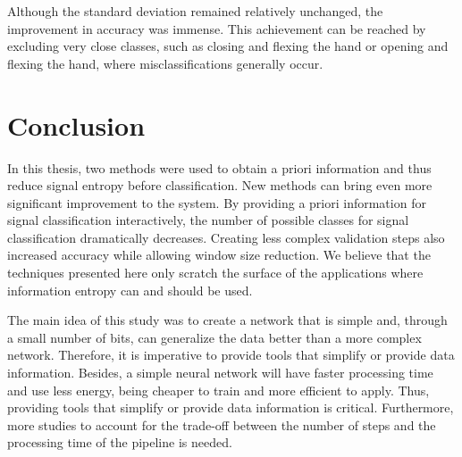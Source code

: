 \documentclass[letterpaper, 10 pt, conference]{ieeeconf}  %
\begin{document}
Although the standard deviation remained relatively unchanged, the improvement in accuracy was immense. This achievement can be reached by excluding very close classes, such as closing and flexing the hand or opening and flexing the hand, where misclassifications generally occur.

\section{Conclusion}

In this thesis, two methods were used to obtain a priori information and thus reduce signal entropy before classification. New methods can bring even more significant improvement to the system. By providing a priori information for signal classification interactively, the number of possible classes for signal classification dramatically decreases. Creating less complex validation steps also increased accuracy while allowing window size reduction. We believe that the techniques presented here only scratch the surface of the applications where information entropy can and should be used.

The main idea of this study was to create a network that is simple and, through a small number of bits, can generalize the data better than a more complex network. Therefore, it is imperative to provide tools that simplify or provide data information. Besides, a simple neural network will have faster processing time and use less energy, being cheaper to train and more efficient to apply. Thus, providing tools that simplify or provide data information is critical. Furthermore, more studies to account for the trade-off between the number of steps and the processing time of the pipeline is needed.

\addtolength{\textheight}{-12cm}   %




\end{document}
